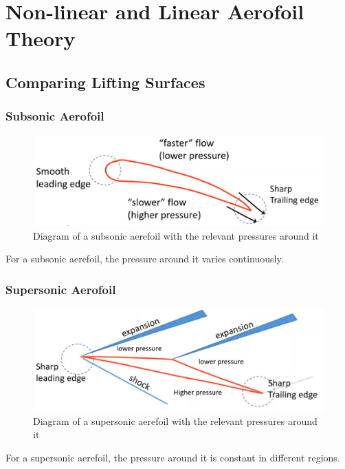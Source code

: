 \chapter{Non-linear and Linear Aerofoil Theory}
\section{Comparing Lifting Surfaces}
\subsection{Subsonic Aerofoil}
\begin{figure}[H]
    \centering
    \includegraphics[width = 0.9 \textwidth]{./img/diagram30.png}
    \caption{Diagram of a subsonic aerefoil with the relevant pressures around it}
\end{figure}
For a subsonic aerefoil, the pressure around it varies continuously.
\subsection{Supersonic Aerofoil}
\begin{figure}[H]
    \centering
    \includegraphics[width = 0.9 \textwidth]{./img/diagram31.png}
    \caption{Diagram of a supersonic aerefoil with the relevant pressures around it}
\end{figure}
For a supersonic aerefoil, the pressure around it is constant in different regions.
